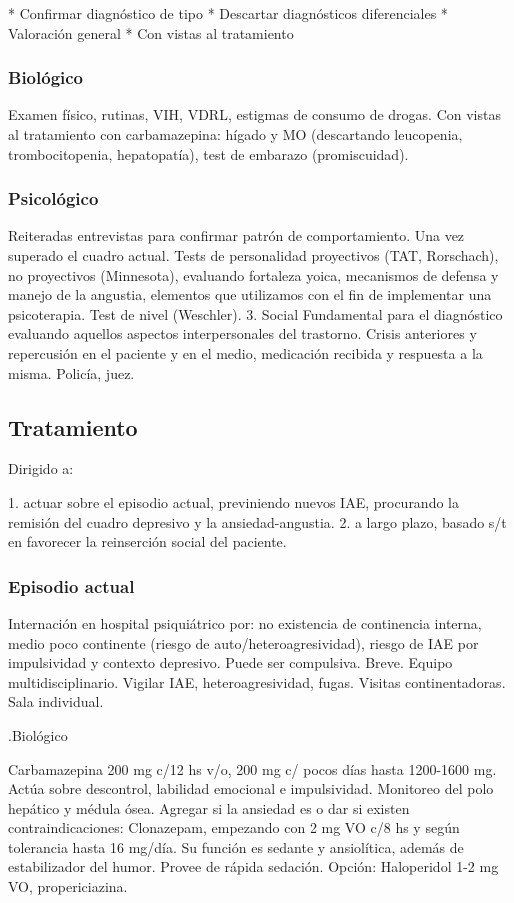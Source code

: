 * Confirmar diagnóstico de tipo
* Descartar diagnósticos diferenciales
* Valoración general
* Con vistas al tratamiento

\subsubsection*{Biológico}
Examen físico, rutinas, VIH, VDRL, estigmas de consumo de drogas. Con vistas al tratamiento con carbamazepina: hígado y MO (descartando leucopenia, trombocitopenia, hepatopatía), test de embarazo (promiscuidad).
\subsubsection*{Psicológico}
Reiteradas entrevistas para confirmar patrón de comportamiento. Una vez superado el cuadro actual. Tests de personalidad proyectivos (TAT, Rorschach), no proyectivos (Minnesota), evaluando fortaleza yoica, mecanismos de defensa y manejo de la angustia, elementos que utilizamos con el fin de implementar una psicoterapia. Test de nivel (Weschler). 3. Social Fundamental para el diagnóstico evaluando aquellos aspectos interpersonales del trastorno. Crisis anteriores y repercusión en el paciente y en el medio, medicación recibida y respuesta a la misma. Policía, juez.
\subsection*{Tratamiento}

Dirigido a:

1. actuar sobre el episodio actual, previniendo nuevos IAE, procurando la remisión del cuadro depresivo y la ansiedad-angustia.
2. a largo plazo, basado s/t en favorecer la reinserción social del paciente.
\subsubsection*{Episodio actual}
Internación en hospital psiquiátrico por: no existencia de continencia interna, medio poco continente (riesgo de auto/heteroagresividad), riesgo de IAE por impulsividad y contexto depresivo. Puede ser compulsiva. Breve. Equipo multidisciplinario. Vigilar IAE, heteroagresividad, fugas. Visitas continentadoras. Sala individual.

.Biológico

Carbamazepina 200 mg c/12 hs v/o, 200 mg c/ pocos días hasta 1200-1600 mg. Actúa sobre descontrol, labilidad emocional e impulsividad. Monitoreo del polo hepático y médula ósea. Agregar si la ansiedad es o dar si existen contraindicaciones: Clonazepam, empezando con 2 mg VO c/8 hs y según tolerancia hasta 16 mg/día. Su función es sedante y ansiolítica, además de estabilizador del humor. Provee de rápida sedación. Opción: Haloperidol 1-2 mg VO, propericiazina.


